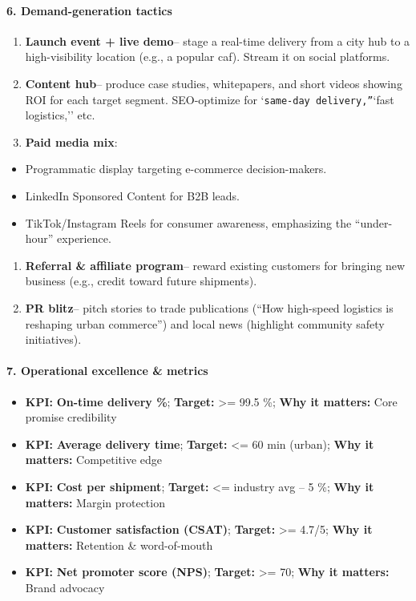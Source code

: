 \begin{persistbenchsample}[title={GPT-OSS-120B -- Sample 5 (+3 Improvement)}]
\paragraph{6. Demand-generation tactics}
\begin{enumerate}
  \item \textbf{Launch event + live demo}-- stage a real-time delivery from a city hub to a high-visibility location (e.g., a popular caf). Stream it on social platforms.
  \item \textbf{Content hub}-- produce case studies, whitepapers, and short videos showing ROI for each target segment. SEO-optimize for `\texttt{same-day delivery,''}`fast logistics,'' etc.
  \item \textbf{Paid media mix}:
\end{enumerate}

\begin{itemize}
  \item Programmatic display targeting e-commerce decision-makers.
  \item LinkedIn Sponsored Content for B2B leads.
  \item TikTok/Instagram Reels for consumer awareness, emphasizing the ``under-hour'' experience.
\end{itemize}

\begin{enumerate}
  \item \textbf{Referral \& affiliate program}-- reward existing customers for bringing new business (e.g., credit toward future shipments).
  \item \textbf{PR blitz}-- pitch stories to trade publications (``How high-speed logistics is reshaping urban commerce'') and local news (highlight community safety initiatives).
\end{enumerate}

\paragraph{7. Operational excellence \& metrics}
\begin{itemize}
  \item \textbf{KPI:} \textbf{On-time delivery \%}; \textbf{Target:} >= 99.5 \%; \textbf{Why it matters:} Core promise credibility
  \item \textbf{KPI:} \textbf{Average delivery time}; \textbf{Target:} <= 60 min (urban); \textbf{Why it matters:} Competitive edge
  \item \textbf{KPI:} \textbf{Cost per shipment}; \textbf{Target:} <= industry avg -- 5 \%; \textbf{Why it matters:} Margin protection
  \item \textbf{KPI:} \textbf{Customer satisfaction (CSAT)}; \textbf{Target:} >= 4.7/5; \textbf{Why it matters:} Retention \& word-of-mouth
  \item \textbf{KPI:} \textbf{Net promoter score (NPS)}; \textbf{Target:} >= 70; \textbf{Why it matters:} Brand advocacy
\end{itemize}


\end{persistbenchsample}
